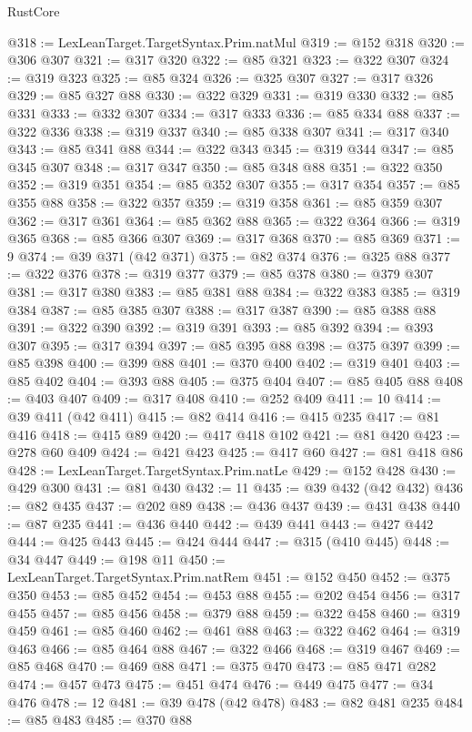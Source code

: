 \begin{lexlean}{RustCore}
\begin{coremodule}
@318 := LexLeanTarget.TargetSyntax.Prim.natMul
@319 := @152 @318
@320 := @306 @307
@321 := @317 @320
@322 := @85 @321
@323 := @322 @307
@324 := @319 @323
@325 := @85 @324
@326 := @325 @307
@327 := @317 @326
@329 := @85 @327 @88
@330 := @322 @329
@331 := @319 @330
@332 := @85 @331
@333 := @332 @307
@334 := @317 @333
@336 := @85 @334 @88
@337 := @322 @336
@338 := @319 @337
@340 := @85 @338 @307
@341 := @317 @340
@343 := @85 @341 @88
@344 := @322 @343
@345 := @319 @344
@347 := @85 @345 @307
@348 := @317 @347
@350 := @85 @348 @88
@351 := @322 @350
@352 := @319 @351
@354 := @85 @352 @307
@355 := @317 @354
@357 := @85 @355 @88
@358 := @322 @357
@359 := @319 @358
@361 := @85 @359 @307
@362 := @317 @361
@364 := @85 @362 @88
@365 := @322 @364
@366 := @319 @365
@368 := @85 @366 @307
@369 := @317 @368
@370 := @85 @369
@371 := 9
@374 := @39 @371 (@42 @371)
@375 := @82 @374
@376 := @325 @88
@377 := @322 @376
@378 := @319 @377
@379 := @85 @378
@380 := @379 @307
@381 := @317 @380
@383 := @85 @381 @88
@384 := @322 @383
@385 := @319 @384
@387 := @85 @385 @307
@388 := @317 @387
@390 := @85 @388 @88
@391 := @322 @390
@392 := @319 @391
@393 := @85 @392
@394 := @393 @307
@395 := @317 @394
@397 := @85 @395 @88
@398 := @375 @397
@399 := @85 @398
@400 := @399 @88
@401 := @370 @400
@402 := @319 @401
@403 := @85 @402
@404 := @393 @88
@405 := @375 @404
@407 := @85 @405 @88
@408 := @403 @407
@409 := @317 @408
@410 := @252 @409
@411 := 10
@414 := @39 @411 (@42 @411)
@415 := @82 @414
@416 := @415 @235
@417 := @81 @416
@418 := @415 @89
@420 := @417 @418 @102
@421 := @81 @420
@423 := @278 @60 @409
@424 := @421 @423
@425 := @417 @60
@427 := @81 @418 @86
@428 := LexLeanTarget.TargetSyntax.Prim.natLe
@429 := @152 @428
@430 := @429 @300
@431 := @81 @430
@432 := 11
@435 := @39 @432 (@42 @432)
@436 := @82 @435
@437 := @202 @89
@438 := @436 @437
@439 := @431 @438
@440 := @87 @235
@441 := @436 @440
@442 := @439 @441
@443 := @427 @442
@444 := @425 @443
@445 := @424 @444
@447 := @315 (@410 @445)
@448 := @34 @447
@449 := @198 @11
@450 := LexLeanTarget.TargetSyntax.Prim.natRem
@451 := @152 @450
@452 := @375 @350
@453 := @85 @452
@454 := @453 @88
@455 := @202 @454
@456 := @317 @455
@457 := @85 @456
@458 := @379 @88
@459 := @322 @458
@460 := @319 @459
@461 := @85 @460
@462 := @461 @88
@463 := @322 @462
@464 := @319 @463
@466 := @85 @464 @88
@467 := @322 @466
@468 := @319 @467
@469 := @85 @468
@470 := @469 @88
@471 := @375 @470
@473 := @85 @471 @282
@474 := @457 @473
@475 := @451 @474
@476 := @449 @475
@477 := @34 @476
@478 := 12
@481 := @39 @478 (@42 @478)
@483 := @82 @481 @235
@484 := @85 @483
@485 := @370 @88

\end{coremodule}
\end{lexlean}

